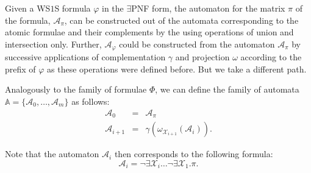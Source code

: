 Given a WS$1$S formula $\varphi$ in the $\exists$PNF form, the automaton for
the matrix $\pi$ of the formula, $\mathcal{A}_\pi$, can be constructed out of
the automata corresponding to the atomic formulae and their complements by the
using operations of union and intersection only. Further, $\mathcal{A}_\varphi$
could be constructed from the automaton $\mathcal{A}_\pi$ by successive
applications of complementation $\gamma$ and projection $\omega$ according to the prefix of $\varphi$ as these
operations were defined before. But we take a different path.

% 


Analogously to the family of formulae $\Phi$, we can define
the family of automata $\mathbb{A} = \{\mathcal{A}_0,\ldots,\mathcal{A}_m\}$ as follows:
 \begin{eqnarray}
  \mathcal{A}_0 & = & \mathcal{A}_\pi\\
  \mathcal{A}_{i+1} & = & \gamma(\omega_{\mathcal{X}_{i+1}}(\mathcal{A}_i)).
 \end{eqnarray}
 
 Note that the automaton $\mathcal{A}_i$ then corresponds to the following
formula:
 \begin{equation} \mathcal{A}_i =
 \neg\exists\mathcal{X}_i\ldots\neg\exists\mathcal{X}_1.
 \pi.
 \end{equation}
 
